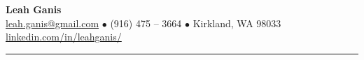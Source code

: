 \documentclass[letterpaper, onecolumn, oneside]{article}
\begin{document}

\begin{center}

{\Large \bfseries Leah Ganis}\\[4pt]
\href{mailto:leah.ganis@gmail.com}{leah.ganis@gmail.com} $\bullet$ (916) 475 -- 3664 $\bullet$ Kirkland, WA 98033 \\
\url{linkedin.com/in/leahganis/}  %

\textcolor{litegrey}{\rule{\textwidth}{.1pt}}

\end{center}
\end{document}
